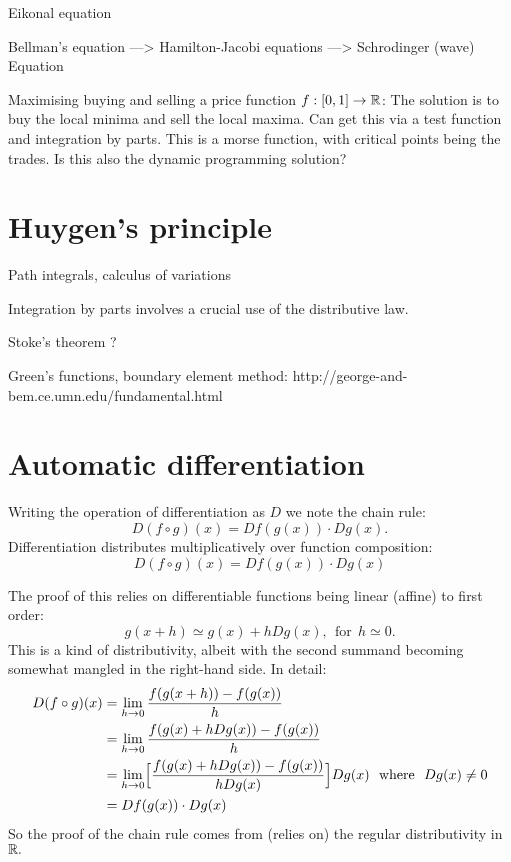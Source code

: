 \documentclass[11pt]{article}
\begin{document}
Eikonal equation

Bellman's equation ---> Hamilton-Jacobi equations ---> Schrodinger (wave) Equation

Maximising buying and selling a price function $f:[0,1]\to \mathbb R$:
    The solution is to buy the local minima and sell the
    local maxima. Can get this via a test function and
    integration by parts. This is a morse function, with
    critical points being the trades.
    Is this also the dynamic programming solution?

%
%

\section{Huygen's principle}

Path integrals, calculus of variations

Integration by parts involves a crucial use of the distributive law.

Stoke's theorem ? %

Green's functions,
boundary element method: http://george-and-bem.ce.umn.edu/fundamental.html


%
%

\section{Automatic differentiation}

Writing the operation of differentiation as $D$
we note the chain rule:
$$
    D(f\circ g)(x) = Df(g(x))\cdot Dg(x).
$$
Differentiation distributes
multiplicatively over function
composition:
$$
    D(f\circ g)(x) = Df(g(x))\cdot Dg(x)
$$

The proof of this relies on differentiable functions being linear (affine) to first order:
$$
    g(x+h) \simeq g(x) + hDg(x), \ \ \mbox{for}\ \ h \simeq 0.
$$
This is a kind of distributivity, albeit with the second summand becoming
somewhat mangled in the right-hand side.
In detail:
\begin{align*}
    D(f\circ g)(x)  &= \lim_{h\to 0} \frac{ f(g(x+h)) - f(g(x)) } {h}  \\
                    &= \lim_{h\to 0} \frac{ f(g(x) + hDg(x)) - f(g(x)) } {h}  \\
                    &= \lim_{h\to 0} \Bigl[\frac{ f(g(x) + hDg(x)) - f(g(x)) } {hDg(x)}\Bigr] Dg(x) \ \ \mbox{where}\ \  Dg(x)\ne 0\\
                    &= Df(g(x))\cdot Dg(x) \\
\end{align*}
So the proof of the chain rule comes from (relies on)
the regular distributivity in $\mathbb R.$
\end{document}
